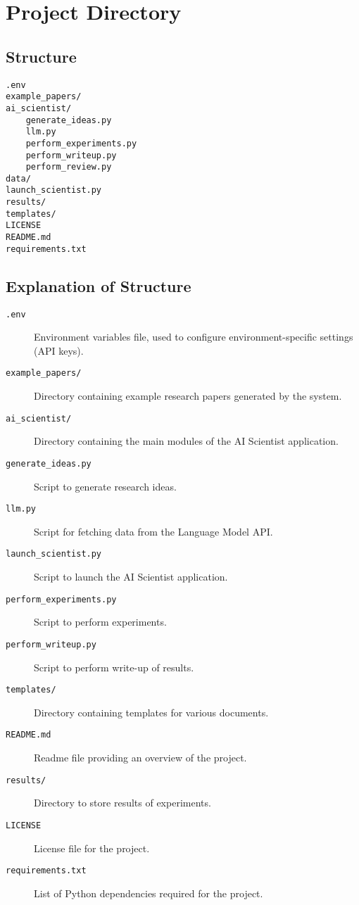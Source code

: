 \section{Project Directory}
\subsection{Structure}
\begin{lstlisting}
.env
example_papers/
ai_scientist/
    generate_ideas.py
    llm.py
    perform_experiments.py
    perform_writeup.py
    perform_review.py
data/
launch_scientist.py
results/
templates/
LICENSE
README.md
requirements.txt
\end{lstlisting}

\subsection{Explanation of Structure}

\begin{description}
  \item[\texttt{.env}] Environment variables file, used to configure environment-specific settings (API keys).
  \item[\texttt{example\_papers/}] Directory containing example research papers generated by the system.
  \item[\texttt{ai\_scientist/}] Directory containing the main modules of the AI Scientist application.
  \item[\texttt{generate\_ideas.py}] Script to generate research ideas.
  \item[\texttt{llm.py}] Script for fetching data from the Language Model API. %
  \item[\texttt{launch\_scientist.py}] Script to launch the AI Scientist application.
  \item[\texttt{perform\_experiments.py}] Script to perform experiments.
  \item[\texttt{perform\_writeup.py}] Script to perform write-up of results.
  \item[\texttt{templates/}] Directory containing templates for various documents.
  \item[\texttt{README.md}] Readme file providing an overview of the project.
  \item[\texttt{results/}] Directory to store results of experiments.
  \item[\texttt{LICENSE}] License file for the project.
  \item[\texttt{requirements.txt}] List of Python dependencies required for the project.
\end{description}

